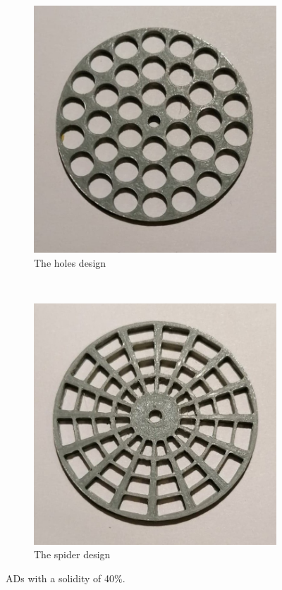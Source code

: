 \begin{figure} [h!]
    \centering
    \begin{subfigure}[b]{0.45\linewidth}
        \includegraphics[width=\textwidth]{0_Images/holes40.jpg}
        \caption{The \gls{holes} design}
        \label{Fig:holes40}
    \end{subfigure}
    ~
    \begin{subfigure}[b]{0.45\linewidth}
        \includegraphics[width=\textwidth]{0_Images/spider40.jpg}
        \caption{The \gls{spider} design}
        \label{Fig:spider40}
    \end{subfigure}
    \caption{\gls{AD}s with a solidity of 40\%.}
    \label{Fig:40Sol}
\end{figure}

